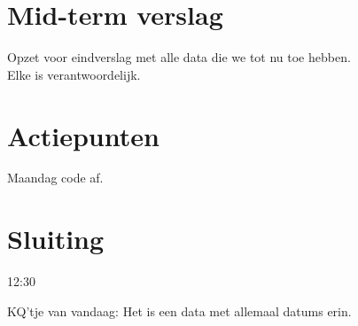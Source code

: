 \documentclass[11pt,twoside,a4paper]{article}
\begin{document}
\section{Mid-term verslag}
Opzet voor eindverslag met alle data die we tot nu toe hebben.\\
Elke is verantwoordelijk.

\section{Actiepunten}
Maandag code af.

\section{Sluiting}
12:30

\vfill
KQ'tje van vandaag: Het is een data met allemaal datums erin.
\end{document}
